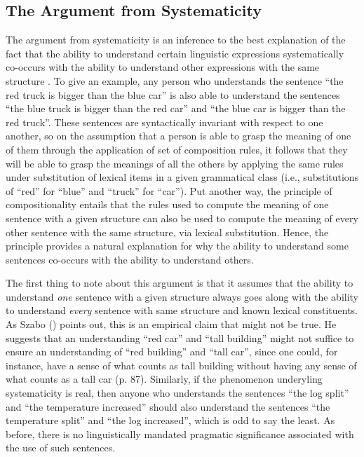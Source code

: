\subsection{The Argument from Systematicity}

The argument from systematicity is an inference to the best explanation of the fact that the ability to understand certain linguistic expressions systematically co-occurs with the ability to understand other expressions with the same structure \citep{FodorPylyshyn:1988,Szabo:2012,Szabo:2013,FodorLepore:2002}. To give an example, any person who understands the sentence ``the red truck is bigger than the blue car'' is also able to understand the sentences ``the blue truck is bigger than the red car'' and ``the blue car is bigger than the red truck''. These sentences are syntactically invariant with respect to one another, so on the assumption that a person is able to grasp the meaning of one of them through the application of set of composition rules, it follows that they will be able to grasp the meanings of all the others by applying the same rules under substitution of lexical items in a given grammatical class (i.e., substitutions of ``red'' for ``blue'' and ``truck'' for ``car''). Put another way, the principle of compositionality entails that the rules used to compute the meaning of one sentence with a given structure can also be used to compute the meaning of every other sentence with the same structure, via lexical substitution. Hence, the principle provides a natural explanation for why the ability to understand some sentences co-occurs with the ability to understand others. 

The first thing to note about this argument is that it assumes that the ability to understand \textit{one} sentence with a given structure always goes along with the ability to understand \textit{every} sentence with same structure and known lexical constituents. As Szabo (\citeyear{Szabo:2013,Szabo:2012}) points out, this is an empirical claim that might not be true. He suggests that an understanding ``red car'' and ``tall building'' might not suffice to ensure an understanding of ``red building'' and ``tall car'', since one could, for instance, have a sense of what counts as tall building without having any sense of what counts as a tall car (p. 87). Similarly, if the phenomenon underyling systematicity is real, then anyone who understands the sentences ``the log split'' and ``the temperature increased'' should also understand the sentences ``the temperature split'' and ``the log increased'', which is odd to say the least. As before, there is no linguistically mandated pragmatic significance associated with the use of such sentences.


